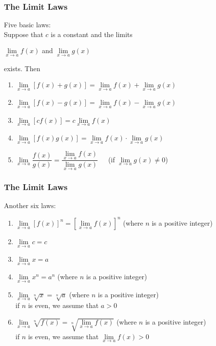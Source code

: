 \begin{frame}
	\frametitle{The Limit Laws}
	Five basic laws:\\
	Suppose that $c$ is a constant and the limits
	\begin{center}
		$\lim\limits_{\textit{x} \to a}f(x)$ and $\lim\limits_{\textit{x} \to a}g(x)$
	\end{center}
	exists. Then
	\begin{enumerate}
		\item $\lim\limits_{\textit{x} \to a}[f(x)+g(x)] = \lim\limits_{\textit{x} \to a}f(x) + \lim\limits_{\textit{x} \to a}g(x)$
		\item $\lim\limits_{\textit{x} \to a}[f(x)-g(x)] = \lim\limits_{\textit{x} \to a}f(x) - \lim\limits_{\textit{x} \to a}g(x)$
		\item $\lim\limits_{\textit{x} \to a}[cf(x)] = c\lim\limits_{\textit{x} \to a}f(x)$
		\item $\lim\limits_{\textit{x} \to a}[f(x)g(x)] = \lim\limits_{\textit{x} \to a}f(x) \cdot \lim\limits_{\textit{x} \to a}g(x)$
		\item $\lim\limits_{\textit{x} \to a}\dfrac{f(x)}{g(x)} = \dfrac{\lim\limits_{\textit{x} \to a}f(x)}{\lim\limits_{\textit{x} \to a}g(x)}$\ \ \  \alert{(if $\lim\limits_{\textit{x} \to a}g(x) \neq 0$)}
	\end{enumerate}
\end{frame}
\begin{frame}
	\frametitle{The Limit Laws}
	Another six laws:
	\begin{enumerate}
		\item $\lim\limits_{\textit{x} \to a}[f(x)]^{n} = [\lim\limits_{\textit{x} \to a}f(x)]^{n}$ (where $n$ is a positive integer)
		\item $\lim\limits_{\textit{x} \to a}c = c$
		\item $\lim\limits_{\textit{x} \to a}x = a$
		\item $\lim\limits_{\textit{x} \to a}x^{n} = a^{n}$ (where $n$ is a positive integer)
		\item $\lim\limits_{\textit{x} \to a}\sqrt[n]{x} = \sqrt[n]{a}$ (where $n$ is a positive integer)\\
		      \alert{if $n$ is even, we assume that $a > 0$}
		\item $\lim\limits_{\textit{x} \to a}\sqrt[n]{f(x)} = \sqrt[n]{\lim\limits_{\textit{x} \to a}f(x)}$ (where $n$ is a positive integer)\\
		      \alert{if $n$ is even, we assume that $\lim\limits_{\textit{x} \to a}f(x) > 0$}
	\end{enumerate}
\end{frame}
